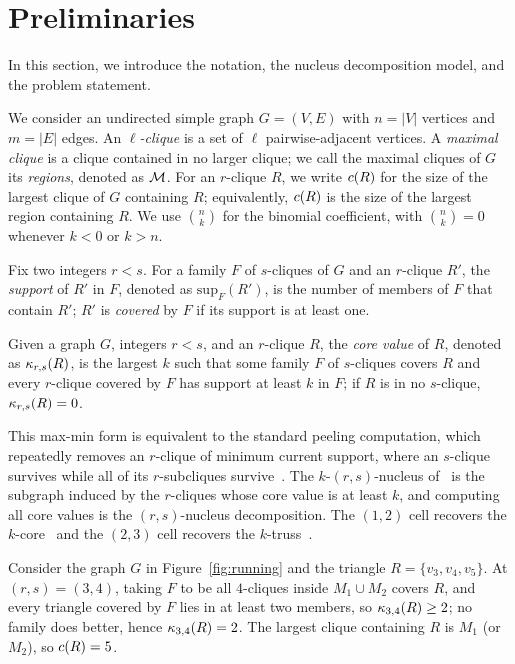 \section{Preliminaries}
\label{sec:prelim}

In this section, we introduce the notation, the nucleus decomposition model, and the problem statement.

We consider an undirected simple graph $G=(V,E)$ with $n=|V|$ vertices and $m=|E|$ edges.
%
An \textit{$\ell$-clique} is a set of $\ell$ pairwise-adjacent vertices.
%
A \textit{maximal clique} is a clique contained in no larger clique; we call the maximal cliques of $G$ its \textit{regions}, denoted as $\mathcal{M}$.
%
For an $r$-clique $R$, we write $c(R)$ for the size of the largest clique of $G$ containing $R$; equivalently, $c(R)$ is the size of the largest region containing $R$.
%
We use $\binom{n}{k}$ for the binomial coefficient, with $\binom{n}{k}=0$ whenever $k<0$ or $k>n$.

Fix two integers $r<s$.
%
For a family $F$ of $s$-cliques of $G$ and an $r$-clique $R'$, the \textit{support} of $R'$ in $F$, denoted as $\mathrm{sup}_F(R')$, is the number of members of $F$ that contain $R'$; $R'$ is \textit{covered} by $F$ if its support is at least one.

\begin{definition}
\label{def:core}
Given a graph $G$, integers $r<s$, and an $r$-clique $R$, the \textit{core value} of $R$, denoted as $\kappa_{r,s}(R)$, is the largest $k$ such that some family $F$ of $s$-cliques covers $R$ and every $r$-clique covered by $F$ has support at least $k$ in $F$; if $R$ is in no $s$-clique, $\kappa_{r,s}(R)=0$.
\end{definition}

This max-min form is equivalent to the standard peeling computation, which repeatedly removes an $r$-clique of minimum current support, where an $s$-clique survives while all of its $r$-subcliques survive~\cite{firstNucleus}.
%
The $k$-$(r,s)$-nucleus of~\cite{firstNucleus} is the subgraph induced by the $r$-cliques whose core value is at least $k$, and computing all core values is the $(r,s)$-nucleus decomposition.
%
The $(1,2)$ cell recovers the $k$-core~\cite{seidman1983network} and the $(2,3)$ cell recovers the $k$-truss~\cite{cohen2008trusses}.

\begin{example}
\label{exa:core}
Consider the graph $G$ in Figure~\ref{fig:running} and the triangle $R=\{v_3,v_4,v_5\}$.
%
At $(r,s)=(3,4)$, taking $F$ to be all $4$-cliques inside $M_1\cup M_2$ covers $R$, and every triangle covered by $F$ lies in at least two members, so $\kappa_{3,4}(R)\ge 2$; no family does better, hence $\kappa_{3,4}(R)=2$.
%
The largest clique containing $R$ is $M_1$ (or $M_2$), so $c(R)=5$.
\end{example}

